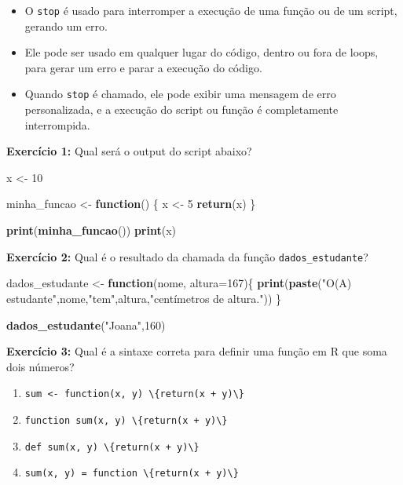\documentclass[
]{book}
\newenvironment{Shaded}{\begin{snugshade}}{\end{snugshade}}
\newcommand{\AttributeTok}[1]{\textcolor[rgb]{0.13,0.29,0.53}{#1}}
\newcommand{\ControlFlowTok}[1]{\textcolor[rgb]{0.13,0.29,0.53}{\textbf{#1}}}
\newcommand{\DecValTok}[1]{\textcolor[rgb]{0.00,0.00,0.81}{#1}}
\newcommand{\FunctionTok}[1]{\textcolor[rgb]{0.13,0.29,0.53}{\textbf{#1}}}
\newcommand{\NormalTok}[1]{#1}
\newcommand{\OtherTok}[1]{\textcolor[rgb]{0.56,0.35,0.01}{#1}}
\newcommand{\StringTok}[1]{\textcolor[rgb]{0.31,0.60,0.02}{#1}}
\theoremstyle{definition}
\theoremstyle{definition}
\theoremstyle{definition}
\theoremstyle{definition}
\theoremstyle{remark}
\begin{document}
\begin{itemize}
\item
  O \texttt{stop} é usado para interromper a execução de uma função ou de um script, gerando um erro.
\item
  Ele pode ser usado em qualquer lugar do código, dentro ou fora de loops, para gerar um erro e parar a execução do código.
\item
  Quando \texttt{stop} é chamado, ele pode exibir uma mensagem de erro personalizada, e a execução do script ou função é completamente interrompida.
\end{itemize}

\textbf{Exercício 1:} Qual será o output do script abaixo?

\begin{Shaded}
\begin{Highlighting}[]
\NormalTok{x }\OtherTok{\textless{}{-}} \DecValTok{10}  

\NormalTok{minha\_funcao }\OtherTok{\textless{}{-}} \ControlFlowTok{function}\NormalTok{() \{}
\NormalTok{    x }\OtherTok{\textless{}{-}} \DecValTok{5}  
    \FunctionTok{return}\NormalTok{(x)}
\NormalTok{\}}

\FunctionTok{print}\NormalTok{(}\FunctionTok{minha\_funcao}\NormalTok{()) }
\FunctionTok{print}\NormalTok{(x) }
\end{Highlighting}
\end{Shaded}

\textbf{Exercício 2:} Qual é o resultado da chamada da função \texttt{dados\_estudante}?

\begin{Shaded}
\begin{Highlighting}[]
\NormalTok{dados\_estudante }\OtherTok{\textless{}{-}} \ControlFlowTok{function}\NormalTok{(nome, }\AttributeTok{altura=}\DecValTok{167}\NormalTok{)\{}
  \FunctionTok{print}\NormalTok{(}\FunctionTok{paste}\NormalTok{(}\StringTok{"O(A) estudante"}\NormalTok{,nome,}\StringTok{"tem"}\NormalTok{,altura,}\StringTok{"centímetros de altura."}\NormalTok{))}
\NormalTok{\}}

\FunctionTok{dados\_estudante}\NormalTok{(}\StringTok{"Joana"}\NormalTok{,}\DecValTok{160}\NormalTok{)}
\end{Highlighting}
\end{Shaded}

\textbf{Exercício 3:} Qual é a sintaxe correta para definir uma função em R que soma dois números?

\begin{enumerate}
\def\labelenumi{(\alph{enumi})}
\item
  \texttt{sum\ \textless{}-\ function(x,\ y)\ \textbackslash{}\{return(x\ +\ y)\textbackslash{}\}}
\item
  \texttt{function\ sum(x,\ y)\ \textbackslash{}\{return(x\ +\ y)\textbackslash{}\}}
\item
  \texttt{def\ sum(x,\ y)\ \textbackslash{}\{return(x\ +\ y)\textbackslash{}\}}
\item
  \texttt{sum(x,\ y)\ =\ function\ \textbackslash{}\{return(x\ +\ y)\textbackslash{}\}}
\end{enumerate}
\end{document}
